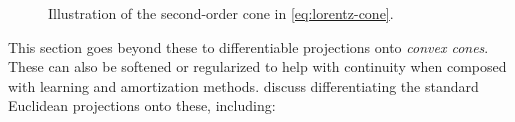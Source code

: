 \begin{figure}[t]
  \centering
  \label{fig:lorentz-cone}
  \caption{Illustration of the second-order cone in \cref{eq:lorentz-cone}.}
\end{figure}


This section goes beyond these to differentiable projections onto
\emph{convex cones}. These can also be softened or regularized
to help with continuity when composed with learning and
amortization methods.
\citet{ali2017semismooth,busseti2019solution} discuss
differentiating the standard Euclidean projections
onto these, including:
